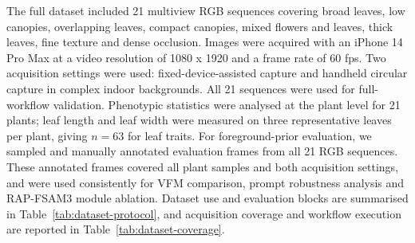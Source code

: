 \documentclass[a4paper]{cas-sc}
\begin{document}
The full dataset included 21 multiview RGB sequences covering broad leaves, low canopies, overlapping leaves, compact canopies, mixed flowers and leaves, thick leaves, fine texture and dense occlusion. Images were acquired with an iPhone 14 Pro Max at a video resolution of 1080 x 1920 and a frame rate of 60 fps. Two acquisition settings were used: fixed-device-assisted capture and handheld circular capture in complex indoor backgrounds. All 21 sequences were used for full-workflow validation. Phenotypic statistics were analysed at the plant level for 21 plants; leaf length and leaf width were measured on three representative leaves per plant, giving \(n = 63\) for leaf traits. For foreground-prior evaluation, we sampled and manually annotated evaluation frames from all 21 RGB sequences. These annotated frames covered all plant samples and both acquisition settings, and were used consistently for VFM comparison, prompt robustness analysis and RAP-FSAM3 module ablation. Dataset use and evaluation blocks are summarised in Table~\ref{tab:dataset-protocol}, and acquisition coverage and workflow execution are reported in Table~\ref{tab:dataset-coverage}.

\begin{table}[pos=!htbp]
\caption{Dataset use and evaluation protocol. The foreground-prior rows refer to manually annotated evaluation frames sampled from all 21 RGB sequences.}\label{tab:dataset-protocol}
\centering
\scriptsize
\setlength{\tabcolsep}{4pt}
\end{table}
\end{document}
